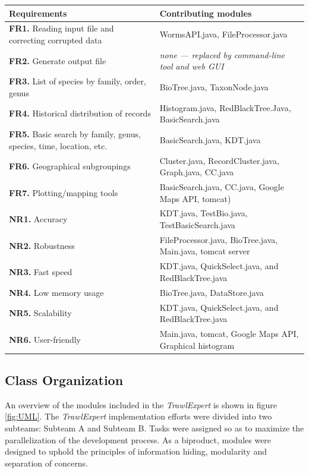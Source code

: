 \documentclass{article}
\begin{document}
\begin{adjustbox}{width= 16.5cm}

\newline
\centering
\begin{tabular}{| l | l |}
\hline
\textbf{Requirements} & \textbf{Contributing modules}\\
\hline
\textbf{FR1.} Reading input file and correcting corrupted data & WormsAPI.java, FileProcessor.java \\
\hline
\textbf{FR2.} Generate output file & \textit{none --- replaced by command-line tool and web GUI} \\
\hline
\textbf{FR3.} List of species by family, order, genus & BioTree.java, TaxonNode.java \\
\hline
\textbf{FR4.} Historical distribution of records & Histogram.java, RedBlackTree.Java, BasicSearch.java \\
\hline
\textbf{FR5.} Basic search by family, genus, species, time, location, etc. & BasicSearch.java, KDT.java \\
\hline
\textbf{FR6.} Geographical subgroupings & Cluster.java, RecordCluster.java, Graph.java, CC.java \\
\hline
\textbf{FR7.} Plotting/mapping tools & BasicSearch.java, CC.java, Google Maps API, tomcat) \\
\hline
\textbf{NR1.} Accuracy & KDT.java, TestBio.java, TestBasicSearch.java \\
\hline
\textbf{NR2.} Robustness & FileProcessor.java, BioTree.java, Main.java, tomcat server \\
\hline
\textbf{NR3.} Fast speed & KDT.java, QuickSelect.java, and RedBlackTree.java \\
\hline
\textbf{NR4.} Low memory usage & BioTree.java, DataStore.java \\
\hline
\textbf{NR5.} Scalability & KDT.java, QuickSelect.java, and RedBlackTree.java \\
\hline
\textbf{NR6.} User-friendly & Main.java, tomcat, Google Maps API, Graphical histogram \\
\hline
\end{tabular}
\label{tab:Req}
\end{adjustbox} 


\subsection{Class Organization}
An overview of the modules included in the \textit{TrawlExpert} is shown in figure \ref{fig:UML}. The \textit{TrawlExpert} implementation efforts were divided into two subteams: Subteam A and Subteam B. Tasks were assigned so as to maximize the parallelization of the development process. As a biproduct, modules were designed to uphold the principles of information hiding, modularity and separation of concerns.
\end{document}
